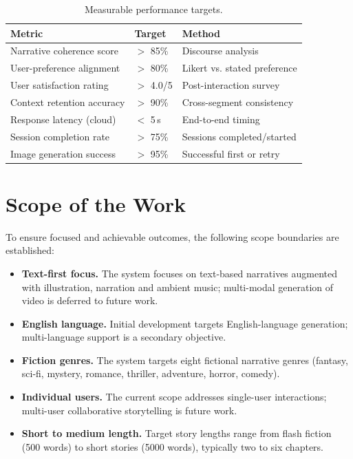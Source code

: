 \begin{table}[!t]
\caption{Measurable performance targets.}
\label{tab:targets}
\centering
\renewcommand{\arraystretch}{1.2}
\begin{tabular}{@{}lll@{}}
\toprule
\textbf{Metric} & \textbf{Target} & \textbf{Method} \\
\midrule
Narrative coherence score   & $>$ 85\%  & Discourse analysis \\
User-preference alignment   & $>$ 80\%  & Likert vs. stated preference \\
User satisfaction rating    & $>$ 4.0/5 & Post-interaction survey \\
Context retention accuracy  & $>$ 90\%  & Cross-segment consistency \\
Response latency (cloud)    & $<$ 5\,s  & End-to-end timing \\
Session completion rate     & $>$ 75\%  & Sessions completed/started \\
Image generation success    & $>$ 95\%  & Successful first or retry \\
\bottomrule
\end{tabular}
\end{table}

\section{Scope of the Work}
To ensure focused and achievable outcomes, the following scope
boundaries are established:

\begin{itemize}
    \item \textbf{Text-first focus.} The system focuses on
    text-based narratives augmented with illustration, narration and
    ambient music; multi-modal generation of video is deferred to
    future work.
    \item \textbf{English language.} Initial development targets
    English-language generation; multi-language support is a
    secondary objective.
    \item \textbf{Fiction genres.} The system targets eight fictional
    narrative genres (fantasy, sci-fi, mystery, romance, thriller,
    adventure, horror, comedy).
    \item \textbf{Individual users.} The current scope addresses
    single-user interactions; multi-user collaborative storytelling
    is future work.
    \item \textbf{Short to medium length.} Target story lengths range
    from flash fiction (500 words) to short stories (5000 words),
    typically two to six chapters.
\end{itemize}

